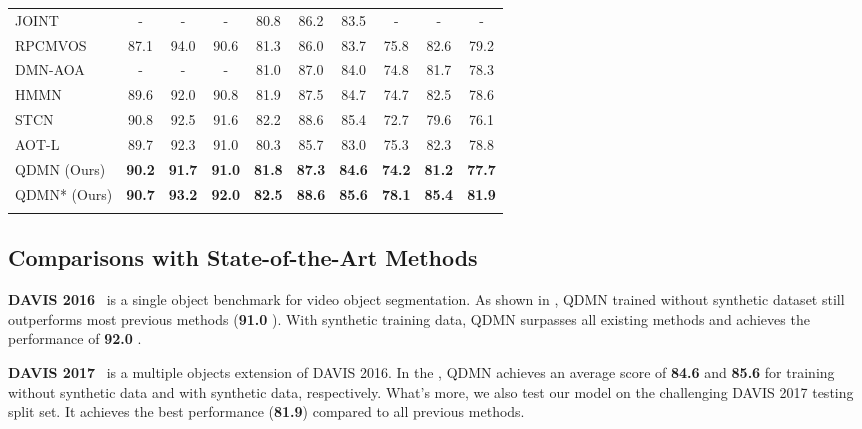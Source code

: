 \documentclass[runningheads]{llncs}
\begin{document}
\begin{table*}[t]
\begin{tabular}{lccccccccc}
			JOINT~\cite{joint}   &- &- &-  & 80.8 & 86.2  & 83.5   &- &- &-  \\
			RPCMVOS~\cite{aaai} &87.1 &94.0 &90.6 &81.3 &86.0 & 83.7 &75.8 &82.6 &79.2\\
			DMN-AOA~\cite{alignment}     &- &- &- & 81.0   & 87.0 & 84.0  &74.8 &81.7 &78.3  \\
			HMMN~\cite{hmm}       &89.6 &92.0 &90.8 &81.9 &87.5 &84.7  & 74.7  & 82.5  & 78.6  \\
			STCN~\cite{stcn}    & 90.8 & 92.5 & 91.6 & 82.2 & 88.6 & 85.4 & 72.7 & 79.6 & 76.1\\
			AOT-L~\cite{aot}  & 89.7  & 92.3 & 91.0 & 80.3   & 85.7 & 83.0 & 75.3   & 82.3 & 78.8\\
			\midrule
			QDMN (Ours)  & \textbf{90.2}  & \textbf{91.7} & \textbf{91.0} & \textbf{81.8}  & \textbf{87.3} & \textbf{84.6} & \textbf{74.2}  & \textbf{81.2}  & \textbf{77.7}\\
			QDMN* (Ours)           & \textbf{90.7}  & \textbf{93.2} & \textbf{92.0} & \textbf{82.5}  & \textbf{88.6} & \textbf{85.6} & \textbf{78.1}  & \textbf{85.4}  & \textbf{81.9}\\
			\bottomrule[1.5pt]
		 \vspace{-25pt}
		\end{tabular}
		
	\end{table*}
	
	
%
 \subsection{Comparisons with State-of-the-Art Methods}

    \noindent\textbf{DAVIS 2016}~\cite{davis16} is a single object benchmark for video object segmentation. As shown in , QDMN trained without synthetic dataset still outperforms most previous methods (\textbf{91.0} ).
    With synthetic training data, QDMN surpasses all existing methods and achieves the performance of \textbf{92.0} .
    

    
    \noindent\textbf{DAVIS 2017}~\cite{davis17} is a multiple objects extension of DAVIS 2016. In the , QDMN achieves an average score of \textbf{84.6} and \textbf{85.6} for training without synthetic data and with synthetic data, respectively. What's more, we also test our model on the challenging DAVIS 2017 testing split set. It achieves the best performance (\textbf{81.9}) compared to all previous methods.
    
\end{document}
